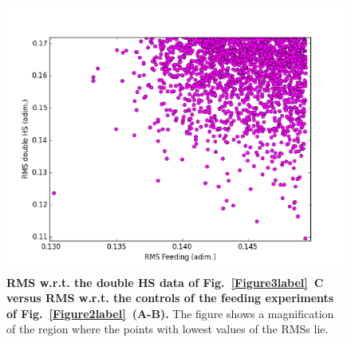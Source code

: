 \documentclass[oneside, 10pt, a4paper, twocolumn]{article}
\begin{document}
\begin{figure}
\centering
\includegraphics[width=\columnwidth]{Figure6_SupMat.pdf}
\caption{\small{\textbf{RMS w.r.t. the double HS data of Fig.~\ref{Figure3label}~C versus RMS w.r.t. the controls of the feeding experiments of Fig.~\ref{Figure2label}~(A-B).} The figure shows a magnification of the region where the points with lowest values of the RMSs lie.  %
}}
\label{Figure6label}
\end{figure}


\end{document}
